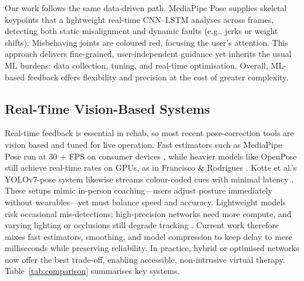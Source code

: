 \documentclass{article}
\begin{document}
Our work follows the same data-driven path. MediaPipe Pose supplies skeletal keypoints that a lightweight real-time CNN–LSTM analyses across frames, detecting both static misalignment and dynamic faults (e.g., jerks or weight shifts). Misbehaving joints are coloured red, focusing the user’s attention. This approach delivers fine-grained, user-independent guidance yet inherits the usual ML burdens: data collection, tuning, and real-time optimisation. Overall, ML-based feedback offers flexibility and precision at the cost of greater complexity.

\subsection{Real-Time Vision-Based Systems}
Real-time feedback is essential in rehab, so most recent pose-correction tools are vision based and tuned for live operation. Fast estimators such as MediaPipe Pose run at 30 + FPS on consumer devices \cite{Tharatipyakul2024Review}, while heavier models like OpenPose still achieve real-time rates on GPUs, as in Francisco \& Rodrigues \cite{Francisco2022}. Kotte et al.’s YOLOv7-pose system likewise streams colour-coded cues with minimal latency \cite{Kotte2023}. These setups mimic in-person coaching—users adjust posture immediately without wearables—yet must balance speed and accuracy. Lightweight models risk occasional mis-detections; high-precision networks need more compute, and varying lighting or occlusions still degrade tracking \cite{Tharatipyakul2024Review}. Current work therefore mixes fast estimators, smoothing, and model compression to keep delay to mere milliseconds while preserving reliability. In practice, hybrid or optimised networks now offer the best trade-off, enabling accessible, non-intrusive virtual therapy. Table~\ref{tab:comparison} summarises key systems.
\end{document}
